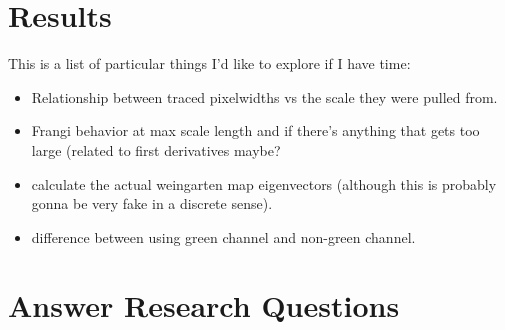 \section{Results}

This is a list of particular things I'd like to explore if I have time:

\begin{itemize}
	\item Relationship between traced pixelwidths vs the scale they were pulled from.
	\item Frangi behavior at max scale length and if there's anything that gets too large (related to first derivatives maybe?
	\item calculate the actual weingarten map eigenvectors (although this is
	probably gonna be very fake in a discrete sense).
	\item difference between using green channel and non-green channel.
\end{itemize}

\section{Answer Research Questions}

